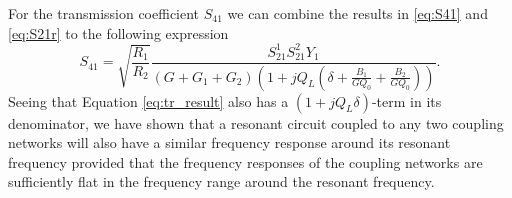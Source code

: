 For the transmission coefficient $S_{41}$ we can combine the results in \eqref{eq:S41} and \eqref{eq:S21r} to the following expression
\begin{equation}\label{eq:tr_result}
S_{41}=\sqrt{\frac{R_1}{R_2}}\frac{S_{21}^1S_{21}^2Y_1}{(G+G_1+G_2)(1+jQ_L(\delta+\frac{B_1}{GQ_0}+\frac{B_2}{GQ_0}))}\text{.}
\end{equation}
Seeing that Equation \eqref{eq:tr_result} also has a $(1+jQ_L\delta)$-term in its denominator, we have shown that a resonant circuit coupled to any two coupling networks will also have a similar frequency response around its resonant frequency provided that the frequency responses of the coupling networks are sufficiently flat in the frequency range around the resonant frequency.
